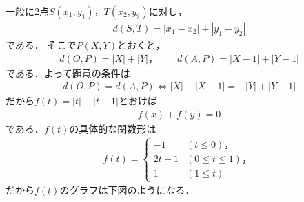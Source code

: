 \documentclass[../../main.tex]{subfiles}
\begin{document}
一般に2点$S(x_1,y_1)$，$T(x_2,y_2)$に対し，
\begin{align}
  d(S,T)=|x_1-x_2|+|y_1-y_2| \label{eq:1}
\end{align}
である．
そこで$P(X,Y)$とおくと，
\begin{align}
  d(O,P)=|X|+|Y|，\qquad d(A,P)=|X-1|+|Y-1| \label{eq:2}
\end{align}
である．よって題意の条件は
\begin{align}
  d(O,P) = d(A,P) \iff |X|-|X-1| = -|Y|+|Y-1|
\end{align}
だから$f(t)=|t|-|t-1|$とおけば
\begin{align}
  f(x)+f(y)=0 \label{eq:3}
\end{align}
である．$f(t)$の具体的な関数形は
\begin{align}
  f(t)=
  \begin{cases}
    -1 & (t\le0)，\\
    2t-1 & (0\le t\le1)，\\
    1 & (1\le t)
  \end{cases}
\end{align}
だから$f(t)$のグラフは下図のようになる．
\end{document}
